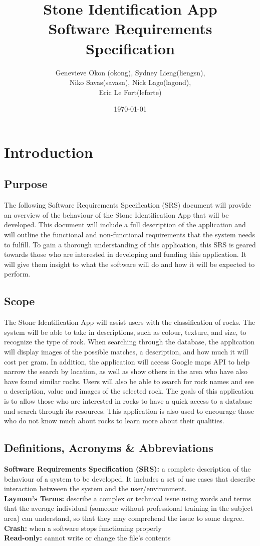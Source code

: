 \documentclass[titlepage]{article}
\title{Stone Identification App \\
	Software Requirements Specification}
\author{Genevieve Okon (okong), Sydney Lieng(liengsn),\\
	Niko Savas(savasn), Nick Lago(lagond),\\
	Eric Le Fort(leforte)}
\date{\today}
\begin{document}
\begin{titlepage}
\maketitle
\end{titlepage}
\tableofcontents
\newpage
\section{Introduction}
\label{sec:introduction}
\subsection{Purpose}
The following Software Requirements Specification (SRS) document will provide an overview of the behaviour of the Stone Identification App that will be developed. This document will include a full description of the application and will outline the functional and non-functional requirements that the system needs to fulfill. To gain a thorough understanding of this application, this SRS is geared towards those who are interested in developing and funding this application. It will give them insight to what the software will do and how it will be expected to perform.
\subsection{Scope}
The Stone Identification App will assist users with the classification of rocks. The system will be able to take in descriptions, such as colour, texture, and size, to recognize the type of rock. When searching through the database, the application will display images of the possible matches, a description, and how much it will cost per gram. In addition, the application will access Google maps API to help narrow the search by location, as well as show others in the area who have also have found similar rocks. Users will also be able to search for rock names and see a description, value and images of the selected rock. The goals of this application is to allow those who are interested in rocks to have a quick access to a database and search through its resources. This application is also used to encourage those who do not know much about rocks to learn more about their qualities. 
\subsection{Definitions, Acronyms \& Abbreviations}
\textbf{Software Requirements Specification (SRS):} a complete description of the behaviour of a system to be developed. It includes a set of use cases that describe interaction betweeen the system and the user/environment.\\
\textbf{Layman's Terms:} describe a complex or technical issue using words and terms that the average individual (someone without professional training in the subject area) can understand, so that they may comprehend the issue to some degree.\\
\textbf{Crash:} when a software stops functioning properly\\
\textbf{Read-only:} cannot write or change the file's contents
\end{document}
